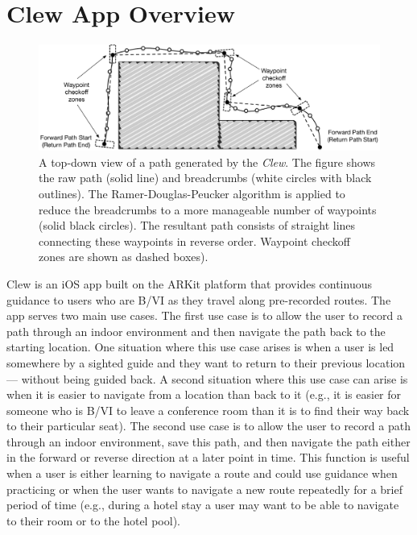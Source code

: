 \documentclass[chi]{sigchi}
\newcommand{\BVI}{B/VI\xspace}
\begin{document}
\section{Clew App Overview}\label{sec:clewoverview}

\begin{figure}
\begin{center}
\includegraphics[width=\linewidth]{Figures/samplepath}
\end{center}
\caption{A top-down view of a path generated by the \emph{Clew}.  The figure shows the raw path (solid line) and breadcrumbs (white circles with black outlines).  The Ramer-Douglas-Peucker algorithm is applied to reduce the breadcrumbs to a more manageable number of waypoints (solid black circles).  The resultant path consists of straight lines connecting these waypoints in reverse order.  Waypoint checkoff zones are shown as dashed boxes).\label{fig:samplepath}}
\end{figure}

Clew is an iOS app built on the ARKit platform that provides continuous guidance to users who are \BVI as they travel along pre-recorded routes.  The app serves two main use cases.  The first use case is to allow the user to record a path through an indoor environment and then navigate the path back to the starting location.  One situation where this use case arises is when a user is led somewhere by a sighted guide and they want to return to their previous location --- without being guided back.  A second situation where this use case can arise is when it is easier to navigate from a location than back to it (e.g., it is easier for someone who is \BVI to leave a conference room than it is to find their way back to their particular seat).  The second use case is to allow the user to record a path through an indoor environment, save this path, and then navigate the path either in the forward or reverse direction at a later point in time.  This function is useful when a user is either learning to navigate a route and could use guidance when practicing or when the user wants to navigate a new route repeatedly for a brief period of time (e.g., during a hotel stay a user may want to be able to navigate to their room or to the hotel pool).
\end{document}
